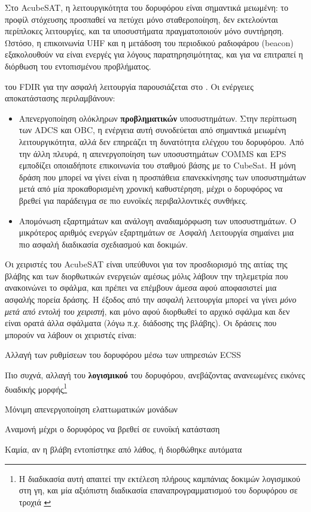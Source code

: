 \documentclass[a4paper,nobib]{tufte-book}
\begin{document}
Στο AcubeSAT, η λειτουργικότητα του δορυφόρου είναι σημαντικά μειωμένη: το προφίλ στόχευσης προσπαθεί να πετύχει μόνο σταθεροποίηση, δεν εκτελούνται περίπλοκες λειτουργίες, και τα υποσυστήματα πραγματοποιούν μόνο συντήρηση. Ωστόσο, η επικοινωνία \ac{UHF} και η μετάδοση του περιοδικού ραδιοφάρου (beacon) εξακολουθούν να είναι ενεργές για λόγους παρατηρησιμότητας, και για να επιτραπεί η διόρθωση του εντοπισμένου προβλήματος.

 του \acs{FDIR} για την ασφαλή λειτουργία παρουσιάζεται στο . Οι ενέργειες αποκατάστασης περιλαμβάνουν:
\begin{itemize}
	\item Απενεργοποίηση ολόκληρων \textbf{προβληματικών} υποσυστημάτων. Στην περίπτωση των \acs{ADCS} και \acs{OBC}, η ενέργεια αυτή συνοδεύεται από σημαντικά μειωμένη λειτουργικότητα, αλλά δεν επηρεάζει τη δυνατότητα ελέγχου του δορυφόρου. Από την άλλη πλευρά, η απενεργοποίηση των υποσυστημάτων \acs{COMMS} και \acs{EPS} εμποδίζει οποιαδήποτε επικοινωνία του σταθμού βάσης με το CubeSat. Η μόνη δράση που μπορεί να γίνει είναι η προσπάθεια επανεκκίνησης των υποσυστημάτων μετά από μία προκαθορισμένη χρονική καθυστέρηση, μέχρι ο δορυφόρος να βρεθεί για παράδειγμα σε πιο ευνοϊκές περιβαλλοντικές συνθήκες.
	\item Απομόνωση εξαρτημάτων και ανάλογη αναδιαμόρφωση των υποσυστημάτων. Ο μικρότερος αριθμός ενεργών εξαρτημάτων σε Ασφαλή Λειτουργία σημαίνει μια πιο ασφαλή διαδικασία σχεδιασμού και δοκιμών.
\end{itemize}


Οι χειριστές του AcubeSAT είναι υπεύθυνοι για τον προσδιορισμό της αιτίας της βλάβης και των διορθωτικών ενεργειών αμέσως μόλις λάβουν την τηλεμετρία που ανακοινώνει το σφάλμα, και πρέπει να επέμβουν άμεσα αφού αποφασιστεί μια ασφαλής πορεία δράσης. Η έξοδος από την ασφαλή λειτουργία μπορεί να γίνει \emph{μόνο μετά από εντολή του χειριστή}, και μόνο αφού διορθωθεί το αρχικό σφάλμα και δεν είναι ορατά άλλα σφάλματα (λόγω π.χ. διάδοσης της βλάβης). Οι δράσεις που μπορούν να λάβουν οι χειριστές είναι:
\begin{compactitem}
	\item Αλλαγή των ρυθμίσεων του δορυφόρου μέσω των υπηρεσιών \acs{ECSS}
	\item Πιο συχνά, αλλαγή του \textbf{λογισμικού} του δορυφόρου, ανεβάζοντας ανανεωμένες εικόνες δυαδικής μορφής\footnote{Η διαδικασία αυτή απαιτεί την εκτέλεση πλήρους καμπάνιας δοκιμών λογισμικού στη γη, και μία αξιόπιστη διαδικασία επαναπρογραμματισμού του δορυφόρου σε τροχιά \autocite[45]{DDJF_OBSW}}
	\item Μόνιμη απενεργοποίηση ελαττωματικών μονάδων
	\item Αναμονή μέχρι ο δορυφόρος να βρεθεί σε ευνοϊκή κατάσταση
	\item Καμία, αν η βλάβη εντοπίστηκε από λάθος, ή διορθώθηκε αυτόματα
\end{compactitem}
\end{document}
